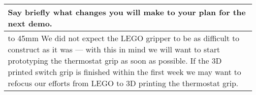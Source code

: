 \documentclass[a4paper]{article}
\newcommand{\colWidth}{141mm}
\begin{document}
\begin{center}
\begin{tabular}{|p{\colWidth}|}
	\hline
	\cellcolor{blue!25}\large
	\textbf{Say briefly what changes you will make to your plan for the next demo.}
	\\ \hline
	\vtop to 45mm{
		We did not expect the LEGO gripper to be as difficult to construct as it was --- with this in mind we will want to start prototyping the thermostat grip as soon as possible. If the 3D printed switch grip is finished within the first week we may want to refocus our efforts from LEGO to 3D printing the thermostat grip.
  	}
  \\
  \hline
\end{tabular}

\end{center}
  
\end{document}
